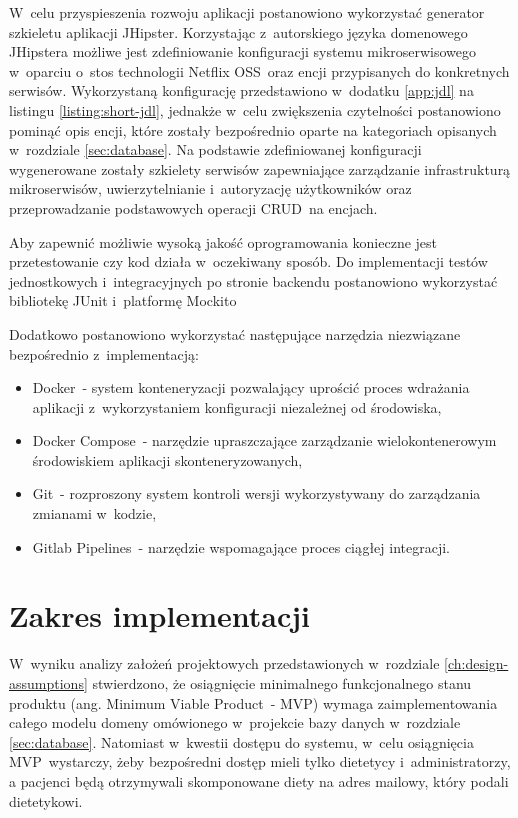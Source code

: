 \par
W~celu przyspieszenia rozwoju aplikacji postanowiono wykorzystać generator szkieletu aplikacji JHipster\cite{tech:jhipster}.
Korzystając z~autorskiego języka domenowego JHipstera możliwe jest zdefiniowanie konfiguracji systemu mikroserwisowego w~oparciu o~stos technologii Netflix OSS~oraz encji przypisanych do konkretnych serwisów.
Wykorzystaną konfigurację przedstawiono w~dodatku \ref{app:jdl} na listingu \ref{listing:short-jdl}, jednakże w~celu zwiększenia czytelności postanowiono pominąć opis encji, które zostały bezpośrednio oparte na kategoriach opisanych w~rozdziale \ref{sec:database}.
Na podstawie zdefiniowanej konfiguracji wygenerowane zostały szkielety serwisów zapewniające zarządzanie infrastrukturą mikroserwisów, uwierzytelnianie i~autoryzację użytkowników oraz przeprowadzanie podstawowych operacji CRUD~na encjach.

\par
Aby zapewnić możliwie wysoką jakość oprogramowania konieczne jest przetestowanie czy kod działa w~oczekiwany sposób.
Do implementacji testów jednostkowych i~integracyjnych po stronie backendu postanowiono wykorzystać bibliotekę JUnit\cite{tech:junit} i~platformę Mockito\cite{tech:mockito}
\par
Dodatkowo postanowiono wykorzystać następujące narzędzia niezwiązane bezpośrednio z~implementacją:
\begin{itemize}
    \item Docker\cite{tech:docker}~- system konteneryzacji pozwalający uprościć proces wdrażania aplikacji z~wykorzystaniem konfiguracji niezależnej od środowiska,
    \item Docker Compose\cite{tech:docker-compose}~- narzędzie upraszczające zarządzanie wielokontenerowym środowiskiem aplikacji skonteneryzowanych,
    \item Git\cite{tech:git}~- rozproszony system kontroli wersji wykorzystywany do zarządzania zmianami w~kodzie,
    \item Gitlab Pipelines\cite{tech:gitlab-pipelines}~- narzędzie wspomagające proces ciągłej integracji.
\end{itemize}

\section{Zakres implementacji}\label{sec:implementation-scope}

W~wyniku analizy założeń projektowych przedstawionych w~rozdziale \ref{ch:design-assumptions} stwierdzono,
że osiągnięcie minimalnego funkcjonalnego stanu produktu (ang. Minimum Viable Product~- MVP)
wymaga zaimplementowania całego modelu domeny omówionego w~projekcie bazy danych w~rozdziale \ref{sec:database}.
Natomiast w~kwestii dostępu do systemu, w~celu osiągnięcia MVP~wystarczy, żeby bezpośredni dostęp mieli tylko dietetycy i~administratorzy,
a pacjenci będą otrzymywali skomponowane diety na adres mailowy, który podali dietetykowi.

